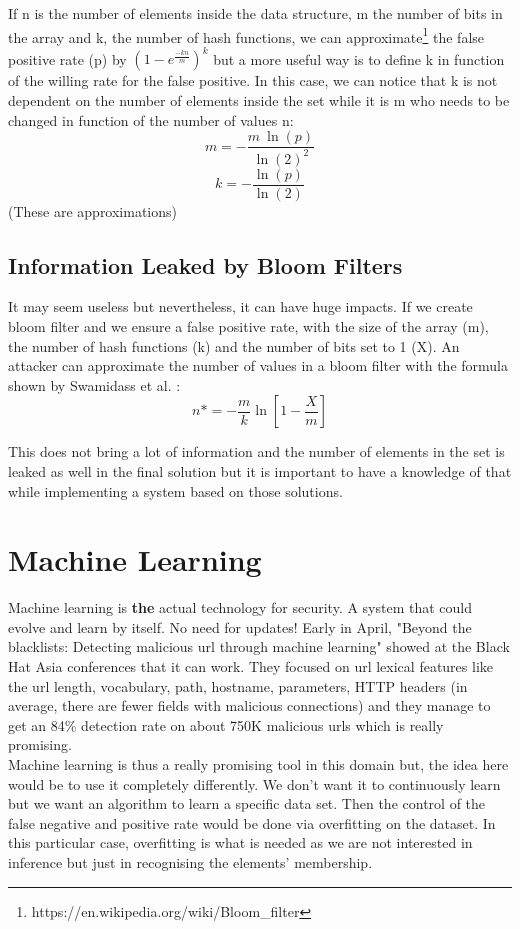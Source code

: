 \documentclass{eplmastersthesis}
\begin{document}
If n is the number of elements inside the data structure, m the number of bits in the array and k, the number of hash functions, we can approximate\footnote{https://en.wikipedia.org/wiki/Bloom\_filter} the false positive rate (p) by $(1-e^{\frac{-kn}{m}})^k$ but a more useful way is to define k in function of the willing rate for the false positive. In this case, we can notice that k is not dependent on the number of elements inside the set while it is m who needs to be changed in function of the number of values n:
$$m = - \frac{m\ \ln(p)}{\ln(2)^2}$$
$$k = - \frac{\ln(p)}{\ln(2)}$$
(These are approximations)

\subsection{Information Leaked by Bloom Filters}
It may seem useless but nevertheless, it can have huge impacts. If we create bloom filter and we ensure a false positive rate, with the size of the array (m), the number of hash functions (k) and the number of bits set to 1 (X). An attacker can approximate the number of values in a bloom filter with the formula shown by Swamidass et al. \cite{swamidass2007mathematical}:
$$n* = - \frac{m}{k} \ln\left[1 - \frac{X}{m}\right] $$

This does not bring a lot of information and the number of elements in the set is leaked as well in the final solution but it is important to have a knowledge of that while implementing a system based on those solutions.

\section{Machine Learning}

Machine learning is \textbf{the} actual technology for security. A system that could evolve and learn by itself. No need for updates! 
Early in April, "Beyond the blacklists: Detecting malicious \gls{url} through machine learning" showed at the Black Hat Asia conferences that it can work.
They focused on \gls{url} lexical features like the \gls{url} length, vocabulary, path, hostname, parameters, HTTP headers (in average, there are fewer fields with malicious connections) and they manage to get an 84\% detection rate on about 750K malicious \gls{url}s which is really promising.\\

Machine learning is thus a really promising tool in this domain but, the idea here would be to use it completely differently. We don't want it to continuously learn but we want an algorithm to learn a specific data set.
Then the control of the false negative and positive rate would be done via overfitting on the dataset.
In this particular case, overfitting is what is needed as we are not interested in inference but just in recognising the elements' membership.\\
\end{document}
